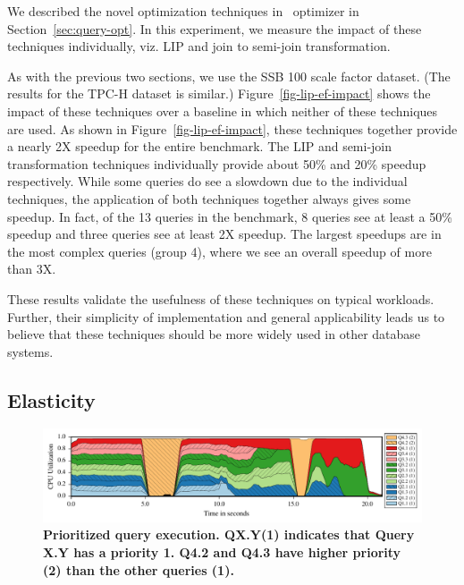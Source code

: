 We described the novel optimization techniques in \Quickstep\ optimizer in Section~\ref{sec:query-opt}. In this experiment,
we measure the impact of these techniques individually, viz. LIP and join to semi-join transformation.

As with the previous two sections, we use the SSB 100 scale factor dataset. (The results for the TPC-H dataset is similar.)
Figure~\ref{fig-lip-ef-impact} shows the impact of these techniques over a baseline in which neither of these techniques are used. As shown in Figure~\ref{fig-lip-ef-impact}, these techniques together provide a nearly 2X speedup for the entire benchmark. The LIP and semi-join transformation techniques individually provide about 50\% and 20\% speedup
respectively. While some queries do see a slowdown due to the individual techniques, the application of both
techniques together always gives some speedup. In fact, of the 13 queries in the benchmark,
8 queries see at least a 50\% speedup and three queries see at least 2X speedup. The largest speedups
are in the most complex queries (group 4), where we see an overall speedup of more than 3X.

These results validate the usefulness of these techniques on typical workloads. Further, their simplicity of implementation and general applicability leads us to believe that these techniques should be more widely used in other database systems.

\subsection{Elasticity} \label{sec:expt:elasticity}

\begin{figure}
	\centering
	\includegraphics[width=\textwidth]{system/figures/2-high-priority-queries.pdf}
	\caption{\textbf{Prioritized query execution. QX.Y(1) indicates that Query X.Y has a priority 1. Q4.2 and Q4.3 have higher priority (2) than the other queries (1).}}
	\label{fig-high-priority}
\end{figure}

